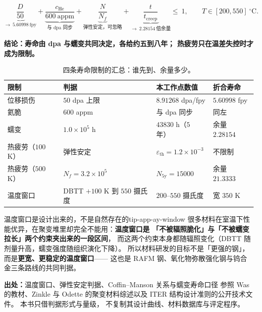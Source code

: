 \begin{equation}
\underbrace{\frac{D}{50}}_{\to\ 5.60998\ \mathrm{fpy}}
+\underbrace{\frac{c_\mathrm{He}}{600\ \mathrm{appm}}}_{\text{与 dpa 同步}}
+\underbrace{\frac{N}{N_f}}_{\text{弹性安定，可忽略}}
+\underbrace{\frac{t}{t_\mathrm{creep}}}_{\to\ 2.28154\ \text{倍余量}}
\le\ 1,
\qquad
T\in[200,550]\ ^\circ\mathrm{C}.
\label{eq:app-ay-budget}
\end{equation}

\noindent\textbf{结论：寿命由 dpa 与蠕变共同决定，各给约五到八年；
热疲劳只在温差失控时才成为限制。}

\begin{table}[htbp]
\centering
\small
\setlength{\tabcolsep}{4pt}
\caption{四条寿命限制的汇总：谁先到、余量多少。}
\label{tab:app-ay-life}
\begin{tabular}{p{4.4cm}p{3.0cm}p{3.2cm}p{2.6cm}}
\toprule
限制 & 判据 & 本工作点数值 & 折合寿命 \\
\midrule
位移损伤 & $50$ dpa 上限 & $8.91268$ dpa/fpy & $5.60998$ fpy \\
氦脆 & $600$ appm & 与 dpa 同步 & 同左 \\
蠕变 & $1.0\times10^{5}$ h & $43830$ h（$5$ 年） & 余量 $2.28154$ \\
热疲劳（$100$ K） & 弹性安定 & $\varepsilon_\mathrm{th}=1.2\times10^{-3}$ & 不限制 \\
热疲劳（$500$ K） & $N_f=3.2\times10^{5}$ & $N_\mathrm{5y}=15000$ & 余量 $21.3333$ \\
温度窗口 & DBTT $+100$ K 到 $550$ 摄氏度 & $200$--$550$ 摄氏度 & 宽 $350$ K \\
\bottomrule
\end{tabular}

\end{table}

\begin{tip}{温度窗口是设计出来的，不是自然存在的}{tip-app-ay-window}
很多材料在室温下性能优异，在聚变堆里却完全不能用：\textbf{温度窗口是
「不被辐照脆化」与「不被蠕变拉长」两个约束夹出来的一段区间}，
而这两个约束本身都随辐照变化（DBTT 随剂量升高，蠕变强度随组织演化下降）。
所以材料研发的目标不是「更强的钢」，而是\textbf{更宽、更稳定的温度窗口}——
这也是 RAFM 钢、氧化物弥散强化钢与钨合金三条路线的共同判据。
\end{tip}

{\footnotesize
\textbf{出处：}温度窗口、弹性安定判据、Coffin--Manson 关系与蠕变寿命口径
参照 Was 的教材、Zinkle 与 Odette 的聚变材料综述以及
ITER 结构设计准则的公开技术文件。
本书只借判据形式与量级，
不复制其设计曲线、材料数据库与评定程序。
}

